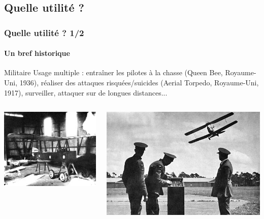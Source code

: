 \documentclass{beamer}
\begin{document}
\subsection{Quelle utilité ?}
\begin{frame}
  \frametitle{Quelle utilité ? 1/2}
  \framesubtitle{Un bref historique}
  \begin{block}{Militaire}
    Usage multiple : entraîner les pilotes à la chasse (Queen Bee, Royaume-Uni, 1936), réaliser des attaques risquées/suicides (Aerial Torpedo, Royaume-Uni, 1917), surveiller, attaquer sur de longues distances...
  \end{block}
  \begin{columns}
    \begin{column}{.5\textwidth}
      \includegraphics[width=\textwidth]{../Images/aerial_torpedo.jpg}
    \end{column}
    \begin{column}{.5\textwidth}
      \includegraphics[width=\textwidth]{../Images/Queen_Bee.jpg}
    \end{column}
  \end{columns}
\end{frame}
\end{document}
